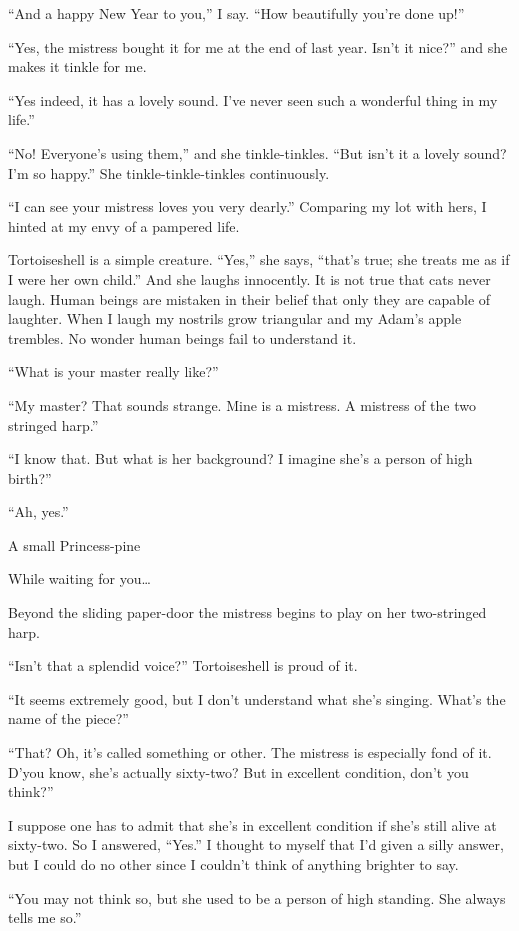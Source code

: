 \documentclass{book}
\begin{document}
``And a happy New Year to you,'' I say. ``How beautifully you're done
up!''

``Yes, the mistress bought it for me at the end of last year. Isn't it
nice?'' and she makes it tinkle for me.

``Yes indeed, it has a lovely sound. I've never seen such a wonderful
thing in my life.''

``No! Everyone's using them,'' and she tinkle-tinkles. ``But isn't it a
lovely sound? I'm so happy.'' She tinkle-tinkle-tinkles continuously.

``I can see your mistress loves you very dearly.'' Comparing my lot with
hers, I hinted at my envy of a pampered life.

Tortoiseshell is a simple creature. ``Yes,'' she says, ``that's true;
she treats me as if I were her own child.'' And she laughs innocently.
It is not true that cats never laugh. Human beings are mistaken in their
belief that only they are capable of laughter. When I laugh my nostrils
grow triangular and my Adam's apple trembles. No wonder human beings
fail to understand it.

``What is your master really like?''

``My master? That sounds strange. Mine is a mistress. A mistress of the
two stringed harp.''

``I know that. But what is her background? I imagine she's a person of
high birth?''

``Ah, yes.''

A small Princess-pine

While waiting for you\ldots{}

Beyond the sliding paper-door the mistress begins to play on her
two-stringed harp.

``Isn't that a splendid voice?'' Tortoiseshell is proud of it.

``It seems extremely good, but I don't understand what she's singing.
What's the name of the piece?''

``That? Oh, it's called something or other. The mistress is especially
fond of it. D'you know, she's actually sixty-two? But in excellent
condition, don't you think?''

I suppose one has to admit that she's in excellent condition if she's
still alive at sixty-two. So I answered, ``Yes.'' I thought to myself
that I'd given a silly answer, but I could do no other since I couldn't
think of anything brighter to say.

``You may not think so, but she used to be a person of high standing.
She always tells me so.''
\end{document}
